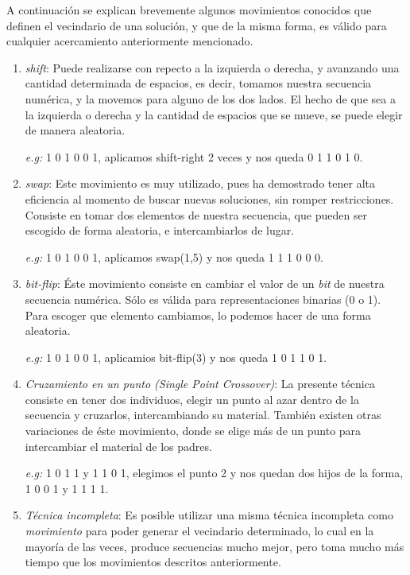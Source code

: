 A continuación se explican brevemente algunos movimientos conocidos que definen el vecindario de 
una solución, y que de la misma forma, es válido para cualquier acercamiento anteriormente
mencionado.
\begin{enumerate}
	\item \emph{shift}: Puede realizarse con repecto a la izquierda o derecha, y avanzando una cantidad determinada de espacios,
		es decir, tomamos nuestra secuencia numérica, y la movemos para alguno de los dos lados. El hecho de que sea a la izquierda
		o derecha y la cantidad de espacios que se mueve, se puede elegir de manera aleatoria.

		\emph{e.g:} 1 0 1 0 0 1, aplicamos shift-right 2 veces y nos queda 0 1 1 0 1 0.
	\item \emph{swap}: Este movimiento es muy utilizado, pues ha demostrado tener alta eficiencia al momento de buscar
		nuevas soluciones, sin romper restricciones. Consiste en tomar dos elementos de nuestra secuencia, que pueden ser escogido
		de forma aleatoria, e intercambiarlos
		de lugar.

		\emph{e.g:} 1 0 1 0 0 1, aplicamos swap(1,5) y nos queda 1 1 1 0 0 0.
	\item \emph{bit-flip}: Éste movimiento consiste en cambiar el valor de un \emph{bit} de nuestra secuencia numérica.
			Sólo es válida para representaciones binarias (0 o 1). Para escoger que elemento cambiamos, lo podemos hacer de una forma
			aleatoria.
		
		\emph{e.g:} 1 0 1 0 0 1, aplicamios bit-flip(3) y nos queda 1 0 1 1 0 1.
	\item \emph{Cruzamiento en un punto (Single Point Crossover)}: La presente técnica consiste en tener dos individuos,
		elegir un punto al azar dentro de la secuencia y cruzarlos, intercambiando su material. También existen otras variaciones
		de éste movimiento, donde se elige más de un punto para intercambiar el material de los padres.

		\emph{e.g:} 1 0 1 1 y 1 1 0 1, elegimos el punto 2 y nos quedan dos hijos de la forma, 1 0 0 1 y 1 1 1 1.
				
	\item \emph{Técnica incompleta}: Es posible utilizar una misma técnica incompleta como \emph{movimiento} para poder generar
		el vecindario determinado, lo cual en la mayoría de las veces, produce secuencias mucho mejor, pero toma mucho más tiempo
		que los movimientos descritos anteriormente.
\end{enumerate}

